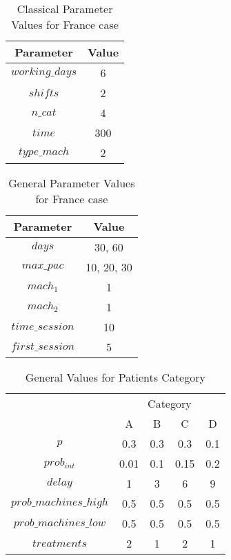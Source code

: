 
\begin{table}[h!]
\centering
\begin{tabular}{|c|c|}
			\hline
			Parameter & Value\\
			\hline
			 $working\_days$	& 6\\
			 $shifts$		& 2\\
			 $n\_cat$		& 4\\
			 $time$			& 300\\
			 $type\_mach$		& 2\\
			 \hline
\end{tabular}
\caption{Classical Parameter Values for France case}
\end{table}

\begin{table}[h!]
\centering
\begin{tabular}{|c|c|}
			\hline
			Parameter & Value\\
			\hline
			 $days$		 & 30, 60\\
			 $max\_pac$	 & 10, 20, 30\\
			 $mach_1$	 & 1\\
			 $mach_2$	 & 1\\
			 $time\_session$ & 10\\
			 $first\_session$& 5\\
			 \hline
\end{tabular}
\caption{General Parameter Values for France case}
\end{table}

\begin{table}[h]
\begin{tabular}{c|c|c|c|c|}
\cline{2-5}
                                             & \multicolumn{4}{c|}{Category} \\ \cline{2-5} 
                                             & A      & B     & C     & D    \\ \hline
\multicolumn{1}{|c|}{$p$}                    & 0.3    & 0.3   & 0.3   & 0.1  \\ \hline
\multicolumn{1}{|c|}{$prob_{int}$}           & 0.01   & 0.1   & 0.15  & 0.2  \\ \hline
\multicolumn{1}{|c|}{$delay$}                & 1      & 3     & 6     & 9    \\ \hline
\multicolumn{1}{|c|}{$prob\_machines\_high$} & 0.5    & 0.5   & 0.5   & 0.5  \\ \hline
\multicolumn{1}{|c|}{$prob\_machines\_low$}  & 0.5    & 0.5   & 0.5   & 0.5  \\ \hline
\multicolumn{1}{|c|}{$treatments$}           & 2      & 1     & 2     & 1    \\ \hline
\end{tabular}
\caption{General Values for Patients Category}
\end{table}

